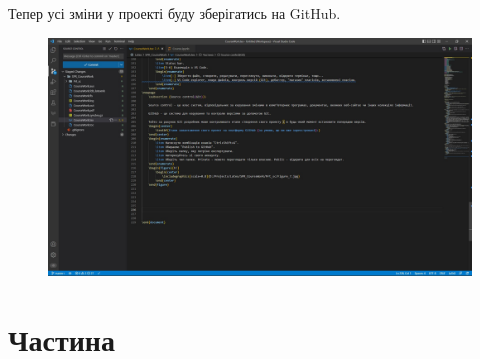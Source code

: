 \documentclass[a4paper,12pt]{article}
\begin{document}
\newpage
    Тепер усі зміни у проекті буду зберігатись на GitHub.
    \begin{figure}[h!]
        \begin{center}
            \includegraphics[scale=0.35]{Prt sc/Figure_8.jpg}
        \end{center}
    \end{figure}

\newpage
    \section{Частина}
\end{document}
